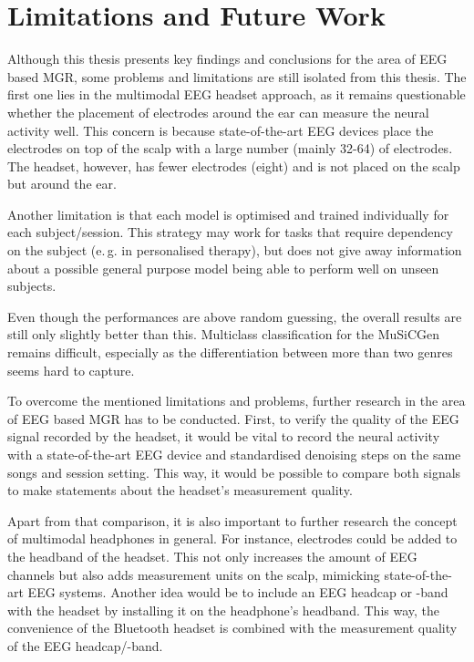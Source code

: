   \section{Limitations and Future Work}
    Although this thesis presents key findings and conclusions for the area of \ac{EEG} based \ac{MGR}, some problems and limitations are still isolated from this thesis. The first one lies in the multimodal \ac{EEG} headset approach, as it remains questionable whether the placement of electrodes around the ear can measure the neural activity well. This concern is because state-of-the-art \ac{EEG} devices place the electrodes on top of the scalp with a large number (mainly 32-64) of electrodes. The headset, however, has fewer electrodes (eight) and is not placed on the scalp but around the ear. \par
    Another limitation is that each model is optimised and trained individually for each subject/session. This strategy may work for tasks that require dependency on the subject (e.\,g. in personalised therapy), but does not give away information about a possible general purpose model being able to perform well on unseen subjects. \par
    Even though the performances are above random guessing, the overall results are still only slightly better than this. Multiclass classification for the \ac{MuSiCGen} remains difficult, especially as the differentiation between more than two genres seems hard to capture. \par
    To overcome the mentioned limitations and problems, further research in the area of \ac{EEG} based \ac{MGR} has to be conducted. First, to verify the quality of the \ac{EEG} signal recorded by the headset, it would be vital to record the neural activity with a state-of-the-art \ac{EEG} device and standardised denoising steps on the same songs and session setting. This way, it would be possible to compare both signals to make statements about the headset's measurement quality.\par
    Apart from that comparison, it is also important to further research the concept of multimodal headphones in general. For instance, electrodes could be added to the headband of the headset. This not only increases the amount of \ac{EEG} channels but also adds measurement units on the scalp, mimicking state-of-the-art \ac{EEG} systems. Another idea would be to include an \ac{EEG} headcap or -band with the headset by installing it on the headphone's headband. This way, the convenience of the Bluetooth headset is combined with the measurement quality of the \ac{EEG} headcap/-band. \par
